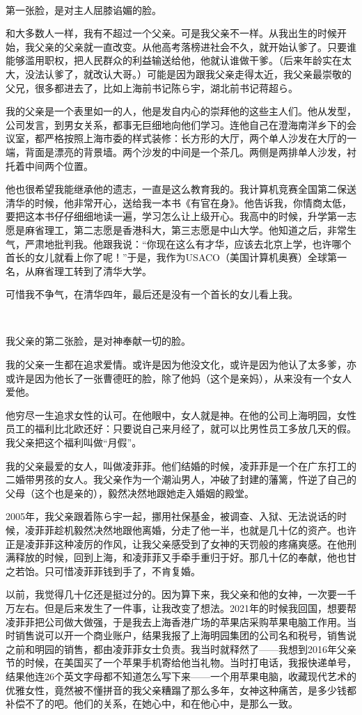 \ 

第一张脸，是对主人屈膝谄媚的脸。

和大多数人一样，我有不超过一个父亲。可是我父亲不一样。从我出生的时候开始，我父亲的父亲就一直改变。从他高考落榜进社会不久，就开始认爹了。只要谁能够滥用职权，把人民群众的利益输送给他，他就认谁做干爹。（后来年龄实在太大，没法认爹了，就改认大哥。）可能是因为跟我父亲走得太近，我父亲最崇敬的父兄，很多都进去了，比如上海前书记陈ら宇，湖北前书记蒋超ら。

我的父亲是一个表里如一的人，他是发自内心的崇拜他的这些主人们。他从发型，公司发言，到男女关系，都事无巨细地向他们学习。连他自己在澄海南洋乡下的会议室，都严格按照上海市委的样式装修：长方形的大厅，两个单人沙发在大厅的一端，背面是漂亮的背景墙。两个沙发的中间是一个茶几。两侧是两排单人沙发，衬托着中间两个位置。

他也很希望我能继承他的遗志，一直是这么教育我的。我计算机竞赛全国第二保送清华的时候，他非常开心，送给我一本书《有官在身》。他告诉我，你情商太低，要把这本书仔仔细细地读一遍，学习怎么让上级开心。我高中的时候，升学第一志愿是麻省理工，第二志愿是香港科大，第三志愿是中山大学。他知道之后，非常生气，严肃地批判我。他跟我说：``你现在这么有才华，应该去北京上学，也许哪个首长的女儿就看上你了呢！''于是，我作为USACO（美国计算机奥赛）全球第一名，从麻省理工转到了清华大学。

可惜我不争气，在清华四年，最后还是没有一个首长的女儿看上我。

\  

我父亲的第二张脸，是对神奉献一切的脸。

我的父亲一生都在追求爱情。或许是因为他没文化，或许是因为他认了太多爹，亦或许是因为他长了一张曹德旺的脸，除了他妈（这个是亲妈），从来没有一个女人爱他。

他穷尽一生追求女性的认可。在他眼中，女人就是神。在他的公司上海明园，女性员工的福利比北欧还好：只要说自己来月经了，就可以比男性员工多放几天的假。我父亲把这个福利叫做``月假''。

我的父亲最爱的女人，叫做凌菲菲。他们结婚的时候，凌菲菲是一个在广东打工的二婚带男孩的女人。我父亲作为一个潮汕男人，冲破了封建的藩篱，忤逆了自己的父母（这个也是亲的），毅然决然地跟她走入婚姻的殿堂。

2005年，我父亲跟着陈ら宇一起，挪用社保基金，被调查、入狱、无法说话的时候，凌菲菲趁机毅然决然地跟他离婚，分走了他一半，也就是几十亿的资产。也许正是凌菲菲这种凌厉的作风，让我父亲感受到了女神的天罚般的疼痛爽感。在他刑满释放的时候，回到上海，和凌菲菲又手牵手重归于好。那几十亿的奉献，他也甘之若饴。只可惜凌菲菲钱到手了，不肯复婚。

以前，我觉得几十亿还是挺过分的。因为算下来，我父亲和他的女神，一次要一千万左右。但是后来发生了一件事，让我改变了想法。2021年的时候我回国，想要帮凌菲菲把公司做大做强，于是我去上海香港广场的苹果店采购苹果电脑工作用。当时销售说可以开一个商业账户，结果我报了上海明园集团的公司名和税号，销售说之前和明园的销售，都由凌菲菲女士负责。我当时就释然了——我想到2016年父亲节的时候，在美国买了一个苹果手机寄给他当礼物。当时打电话，我报快递单号，结果他连26个英文字母都不知道怎么写下来——一个用苹果电脑，收藏现代艺术的优雅女性，竟然被不懂拼音的我父亲糟蹋了那么多年，女神这种痛苦，是多少钱都补偿不了的吧。他们的关系，在她心中，和在他心中，是那么一致。

